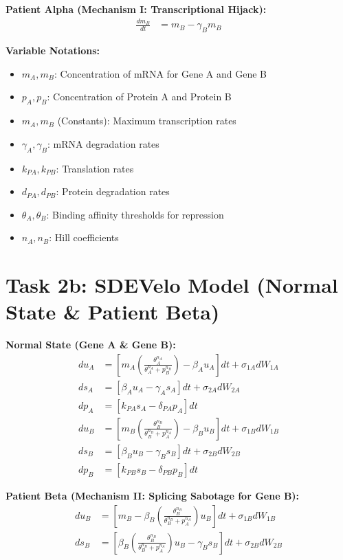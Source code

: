 \documentclass{article}
\begin{document}
\textbf{Patient Alpha (Mechanism I: Transcriptional Hijack):}
\begin{align}
    \frac{dm_B}{dt} &= m_B - \gamma_B m_B
\end{align}

\textbf{Variable Notations:}
\begin{itemize}
    \item $m_A, m_B$: Concentration of mRNA for Gene A and Gene B
    \item $p_A, p_B$: Concentration of Protein A and Protein B
    \item $m_A, m_B$ (Constants): Maximum transcription rates
    \item $\gamma_A, \gamma_B$: mRNA degradation rates
    \item $k_{PA}, k_{PB}$: Translation rates
    \item $d_{PA}, d_{PB}$: Protein degradation rates
    \item $\theta_A, \theta_B$: Binding affinity thresholds for repression
    \item $n_A, n_B$: Hill coefficients
\end{itemize}

\section*{Task 2b: SDEVelo Model (Normal State \& Patient Beta)}

\textbf{Normal State (Gene A \& Gene B):}
\begin{align}
    du_A &= \left[ m_A \left( \frac{\theta_A^{n_A}}{\theta_A^{n_A} + p_B^{n_B}} \right) - \beta_A u_A \right] dt + \sigma_{1A} dW_{1A} \\
    ds_A &= \left[ \beta_A u_A - \gamma_A s_A \right] dt + \sigma_{2A} dW_{2A} \\
    dp_A &= \left[ k_{PA} s_A - \delta_{PA} p_A \right] dt \\
    du_B &= \left[ m_B \left( \frac{\theta_B^{n_B}}{\theta_B^{n_B} + p_A^{n_A}} \right) - \beta_B u_B \right] dt + \sigma_{1B} dW_{1B} \\
    ds_B &= \left[ \beta_B u_B - \gamma_B s_B \right] dt + \sigma_{2B} dW_{2B} \\
    dp_B &= \left[ k_{PB} s_B - \delta_{PB} p_B \right] dt
\end{align}

\textbf{Patient Beta (Mechanism II: Splicing Sabotage for Gene B):}
\begin{align}
    du_B &= \left[ m_B - \beta_B \left( \frac{\theta_B^{n_B}}{\theta_B^{n_B} + p_A^{n_A}} \right) u_B \right] dt + \sigma_{1B} dW_{1B} \\
    ds_B &= \left[ \beta_B \left( \frac{\theta_B^{n_B}}{\theta_B^{n_B} + p_A^{n_A}} \right) u_B - \gamma_B s_B \right] dt + \sigma_{2B} dW_{2B}
\end{align}
\end{document}
